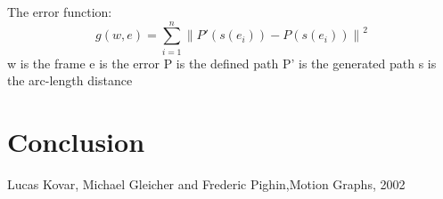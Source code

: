 \documentclass[a4paper]{article}
\begin{document}
The error function:
\[
g(w,e) = \sum_{i=1}^{n}\left \| P'(s(e_{i}))-P(s(e_{i})) \right \|^{2}
\]
w is the frame
e is the error
P is the defined path
P' is the generated path
s is the arc-length distance



\section{Conclusion}




\begin{thebibliography}{}

{Lucas Kovar, Michael Gleicher and Frederic Pighin},{Motion Graphs}, {2002}
    
    
\end{thebibliography} 
\end{document}
